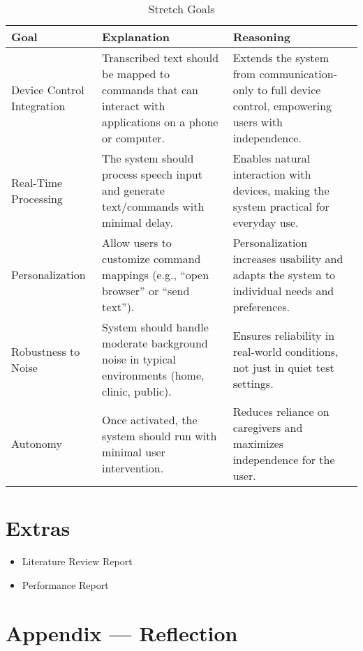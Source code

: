 \documentclass{article}
\begin{document}
\begin{table}[hp]
\caption{Stretch Goals}
\begin{tabularx}{\textwidth}{lXX} \\[-8pt]
\toprule
\textbf{Goal} & \textbf{Explanation} & \textbf{Reasoning}\\
\midrule
Device Control Integration & Transcribed text should be mapped to commands that can interact with applications on a phone or computer. & Extends the system from communication-only to full device control, empowering users with independence.\\
Real-Time Processing & The system should process speech input and generate text/commands with minimal delay. & Enables natural interaction with devices, making the system practical for everyday use.\\
Personalization & Allow users to customize command mappings (e.g., ``open browser'' or ``send text''). & Personalization increases usability and adapts the system to individual needs and preferences.\\
Robustness to Noise & System should handle moderate background noise in typical environments (home, clinic, public). & Ensures reliability in real-world conditions, not just in quiet test settings.\\
Autonomy & Once activated, the system should run with minimal user intervention. & Reduces reliance on caregivers and maximizes independence for the user.\\
\bottomrule
\end{tabularx}
\end{table}

\newpage

\section{Extras}


\begin{itemize}
    \item Literature Review Report
    \item Performance Report
\end{itemize}

\newpage{}

\section*{Appendix --- Reflection}



\end{document}
